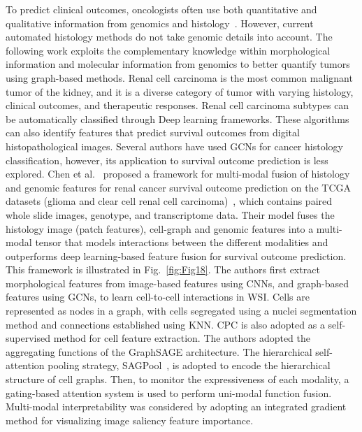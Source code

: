To predict clinical outcomes, oncologists often use both quantitative and qualitative information from genomics and histology{~}. However, current automated histology methods do not take genomic details into account. The following work exploits the complementary knowledge within morphological information and molecular information from genomics to better quantify tumors using graph-based methods.
Renal cell carcinoma is the most common malignant tumor of the kidney, and it is a diverse category of tumor with varying histology, clinical outcomes, and therapeutic responses. 
Renal cell carcinoma subtypes can be automatically classified through Deep learning frameworks. These algorithms can also identify features that predict survival outcomes from digital histopathological images. Several authors have used GCNs for cancer histology classification, however, its application to survival outcome prediction is less explored. 
Chen et al.~ proposed a framework for multi-modal fusion of histology and genomic features for renal cancer survival outcome prediction on the TCGA datasets (glioma and clear cell renal cell carcinoma)~, which contains paired whole slide images, genotype, and transcriptome data.
Their model fuses the histology image (patch features), cell-graph and genomic features into a multi-modal tensor that models interactions between the different modalities and outperforms deep learning-based feature fusion for survival outcome prediction.
This framework is illustrated in Fig.~\ref{fig:Fig18}.
The authors first extract morphological features from image-based features using CNNs, and graph-based features using GCNs, to learn cell-to-cell interactions in WSI. Cells are represented as nodes in a graph, with cells segregated using a nuclei segmentation method and connections established using KNN. 
CPC is also adopted as a self-supervised method for cell feature extraction.
The authors adopted the aggregating functions of the GraphSAGE architecture. The hierarchical self-attention pooling strategy, SAGPool~, is adopted to encode the hierarchical structure of cell graphs.
Then, to monitor the expressiveness of each modality, a gating-based attention system is used to perform uni-modal function fusion.
Multi-modal interpretability was considered by adopting an integrated gradient method for visualizing image saliency feature importance.

